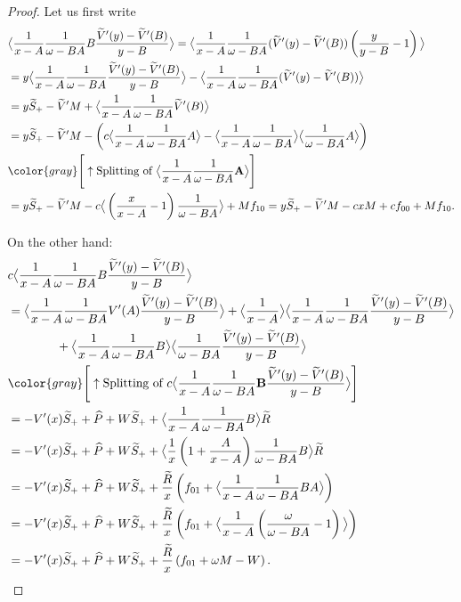 \documentclass{scrartcl}
\newcommand{\gr}[1]{{\color{gray} #1}}
\newcommand\brak[1]{\big \langle #1 \big\rangle}
\begin{document}
\begin{proof}
Let us first write
\begin{align*}
    &\brak{\frac{1}{x-A}\frac{1}{\omega - BA}B\frac{\widetilde{V}'(y)-\widetilde{V}'(B)}{y-B}}= \brak{\frac{1}{x-A}\frac{1}{\omega - BA}(\widetilde{V}'(y)-\widetilde{V}'(B))\left(\frac{y}{y-B}-1\right)} \\
    &= y\brak{\frac{1}{x-A}\frac{1}{\omega - BA}\frac{\widetilde{V}'(y)-\widetilde{V}'(B)}{y-B}} - \brak{\frac{1}{x-A}\frac{1}{\omega - BA}(\widetilde{V}'(y)-\widetilde{V}'(B))} \\
    &= y\widetilde{S}_+ - \widetilde{V}'M + \brak{\frac{1}{x-A}\frac{1}{\omega - BA}\widetilde{V}'(B)} \\
    &=  y\widetilde{S}_+ - \widetilde{V}'M - \left(c\brak{\frac{1}{x-A}\frac{1}{\omega - BA}A} - \brak{\frac{1}{x-A}\frac{1}{\omega - BA}}\brak{\frac{1}{\omega - BA}A} \right)\\
&\gr{\Bigg[\uparrow\textnormal{Splitting of }\brak{\frac{1}{x-A}\frac{1}{\omega - BA}\mathbf{A}}\Bigg]}\\ 
    &= y\widetilde{S}_+ - \widetilde{V}'M - c\brak{\left(\frac{x}{x-A}-1\right)\frac{1}{\omega - BA}} + Mf_{10} = y\widetilde{S}_+ - \widetilde{V}'M - cxM + cf_{00} + Mf_{10}.
\end{align*}

On the other hand:
\begin{align*}
 &c\brak{\frac{1}{x-A}\frac{1}{\omega - BA}B\frac{\widetilde{V}'(y)-\widetilde{V}'(B)}{y-B}} \\
    &=\brak{\frac{1}{x-A}\frac{1}{\omega - BA}V'(A)\frac{\widetilde{V}'(y)-\widetilde{V}'(B)}{y-B}} + \brak{\frac{1}{x-A}}\brak{\frac{1}{x-A}\frac{1}{\omega - BA}\frac{\widetilde{V}'(y)-\widetilde{V}'(B)}{y-B}} \\
    &\hspace{4em}+ \brak{\frac{1}{x-A}\frac{1}{\omega - BA}B}\brak{\frac{1}{\omega - BA}\frac{\widetilde{V}'(y)-\widetilde{V}'(B)}{y-B}} \\
&\gr{\Bigg[\uparrow\textnormal{Splitting of } c\brak{\frac{1}{x-A}\frac{1}{\omega - BA}\mathbf{B}\frac{\widetilde{V}'(y)-\widetilde{V}'(B)}{y-B}}\Bigg]}\\ 
    &= -V'(x)\widetilde{S}_++\widehat{P} + W\widetilde{S}_+ +\brak{\frac{1}{x-A}\frac{1}{\omega - BA}B}\widetilde{R} \\
    &= -V'(x)\widetilde{S}_++\widehat{P}+W\widetilde{S}_++\brak{\frac{1}{x}\left(1+\frac{A}{x-A}\right)\frac{1}{\omega - BA}B}\widetilde{R} \\
    &= -V'(x)\widetilde{S}_++\widehat{P}+W\widetilde{S}_++\frac{\widetilde{R}}{x}\left(f_{01} + \brak{\frac{1}{x-A}\frac{1}{\omega - BA}BA}\right) \\
    &= -V'(x)\widetilde{S}_++\widehat{P}+W\widetilde{S}_++\frac{\widetilde{R}}{x}\left(f_{01} + \brak{\frac{1}{x-A}\left(\frac{\omega}{\omega - BA}-1\right)}\right) \\
    &= -V'(x)\widetilde{S}_++\widehat{P}+W\widetilde{S}_++\frac{\widetilde{R}}{x}\left(f_{01} + \omega M - W\right).
\end{align*}


\end{proof}
\end{document}
